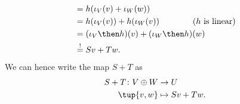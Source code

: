 \begin{example}
\begin{equation*}
\begin{aligned}
            &=h(\iota_V(v)+\iota_W(w)) \\
            &=h(\iota_V(v))+h(\iota_W(v)) \qquad \qquad (h \text{ is linear})\\
            &=(\iota_V\then h)(v)+(\iota_W\then h)(w)\\
            &\overset{!}{=}Sv+Tw.
        \end{aligned}
    \end{equation*}
    We can hence write the map $S+T$ as
    \begin{equation*}
        \begin{aligned}
            S+T\colon V\oplus W&\to U\\
            \tup{v,w}&\mapsto Sv+Tw.
        \end{aligned}
    \end{equation*}
\end{example}

